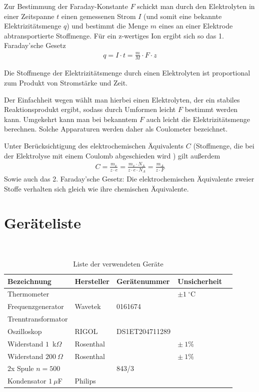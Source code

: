 \documentclass{article}
\begin{document}
Zur Bestimmung der Faraday-Konstante $F$ schickt man durch den Elektrolyten in einer Zeitspanne $t$ einen gemessenen Strom $I$ (und somit eine bekannte Elektrizitätsmenge $q$) und bestimmt die Menge $m$ eines an einer Elektrode abtransportierte Stoffmenge. Für ein z-wertiges Ion ergibt sich so das 1. Faraday'sche Gesetz
\begin{align}
q = I\cdot t = \frac{m}{M} \cdot F \cdot z
\end{align}



Die Stoffmenge der Elektrizitätsmenge durch einen Elektrolyten ist proportional zum Produkt von Stromstärke und Zeit.

Der Einfachheit wegen wählt man hierbei einen Elektrolyten, der ein stabiles Reaktionsprodukt ergibt, sodass durch Umformen leicht $F$ bestimmt werden kann. Umgekehrt kann man bei bekanntem $F$ auch leicht die Elektrizitätsmenge berechnen. Solche Apparaturen werden daher als Coulometer bezeichnet.

Unter Berücksichtigung des elektrochemischen Äquivalents $C$ (Stoffmenge, die bei der Elektrolyse mit einem Coulomb abgeschieden wird \cite{chemie}) gilt außerdem
\begin{align}
C = \frac{m_x}{z\cdot e} = \frac{m_x\cdot N_A}{z\cdot e \cdot N_A} = \frac{m_A}{z\cdot F}
\end{align}
Sowie auch das 2. Faraday'sche Gesetz: Die elektrochemischen Äquivalente zweier Stoffe verhalten sich gleich wie ihre chemischen Äquivalente.





\section{Geräteliste}

\begin{table}[H]
\caption{Liste der verwendeten Geräte}

~

\begin{tabular}{l|llll}
Bezeichnung & Hersteller & Gerätenummer & Unsicherheit \\
\hline
Thermometer & & & $\pm 1~^\circ$C \\
Frequenzgenerator & Wavetek & 0161674  \\
Trenntransformator & \\
Oszilloskop & RIGOL &DS1ET204711289 \\
Widerstand $1$~k$\Omega$ & Rosenthal & & $\pm~1\%$ \\
Widerstand $200~\Omega$ & Rosenthal & & $\pm~1\%$ \\
2x Spule $n=500$ & & 843/3 \\
Kondensator $1~\mu$F & Philips
\end{tabular}

\end{table}
\end{document}
